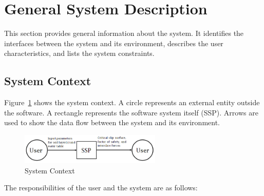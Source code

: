 \documentclass[12pt]{article}
\newcommand{\progname}{SSP}
\begin{document}

\section{General System Description}

This section provides general information about the system. It identifies the 
interfaces between the system and its environment, describes the user 
characteristics, and lists the system constraints.

\subsection{System Context}

Figure~\ref{Fig_SystemContext} shows the system context.  A circle represents an
external entity outside the software.  A rectangle represents the software 
system itself (\progname).  Arrows are used to show the data flow between the 
system and its environment.

\begin{figure}[h!]
	\begin{center}
		\includegraphics[width=0.6\textwidth]{SystemContextFigure.png}
		\caption{System Context}
		\label{Fig_SystemContext}
	\end{center}
\end{figure}

\noindent The responsibilities of the user and the system are as follows:
\end{document}
